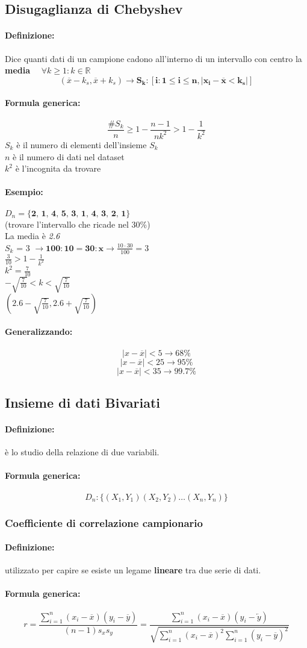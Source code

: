 \documentclass[]{article}
\newcommand{\definizione}{\paragraph{Definizione:}}
\newcommand{\formula}{\paragraph{Formula generica:}}
\begin{document}
    \subsection{Disugaglianza di Chebyshev}
    \definizione Dice quanti dati di un campione cadono all'interno di un intervallo con centro la \textbf{media} $\quad \forall k \geq 1 : k \in \mathbb{R}$
    \[ (\overline{x} - k_s, \overline{x} + k_s) \longrightarrow \boldsymbol{S_k : [i : 1 \leq i \leq n, |x_i - \overline{x} < k_s|]} \]
    \formula 
    \[ \frac{\#S_k}{n} \geq 1 - \frac{n - 1}{nk^2} > 1 - \frac{1}{k^2} \]
    $S_k$ è il numero di elementi dell'insieme $S_k$ \\
    $n$ è il numero di dati nel dataset \\
    $k^2$ è l'incognita da trovare

    \paragraph{Esempio:} $D_n = \textbf{\{2, 1, 4, 5, 3, 1, 4, 3, 2, 1\}}$ \\
    (trovare l'intervallo che ricade nel 30\%) \\
    La media è \textit{2.6} \\
    $S_k$ = 3 $\longrightarrow \boldsymbol{100 : 10 = 30 : x} \longrightarrow \frac{10 \cdot 30}{100} = 3 $ \\
    $\frac{3}{10} > 1 - \frac{1}{k^2}$ \\
    $k^2 = \frac{7}{10}$ \\
    $-\sqrt{\frac{7}{10}} < k < \sqrt{\frac{7}{10}}$ \\
    $(2.6 - \sqrt{\frac{7}{10}}, 2.6 + \sqrt{\frac{7}{10}}) $
    \paragraph{Generalizzando:}
    \[ |x - \overline{x}| < 5 \longrightarrow 68\% \]
    \[ |x - \overline{x}| < 25 \longrightarrow 95\% \]
    \[ |x - \overline{x}| < 35 \longrightarrow 99.7\% \]

    \subsection{Insieme di dati Bivariati}
    \definizione è lo studio della relazione di due variabili.
    \formula \[ D_n : \{(X_1, Y_1) (X_2, Y_2) \ldots (X_n, Y_n)\}\]

    \subsubsection{Coefficiente di correlazione campionario}
    \definizione utilizzato per capire se esiste un legame \textbf{lineare} tra due serie di dati.
    \formula 
    \begin{equation*}
        r = \frac{\sum_{i = 1}^{n}(x_i - \overline{x}) (y_i - \overline{y})}{(n-1) s_x s_y} = \frac{\sum_{i = 1}^{n} (x_i - \overline{x}) (y_i - \overleftarrow{y})}{\sqrt{\sum_{i = 1}^{n} (x_i - \overline{x})^2 \sum_{i = 1}^{n} (y_i - \overline{y})^2}}
    \end{equation*}
\end{document}
